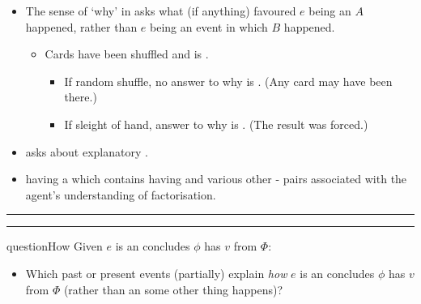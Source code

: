 \documentclass[10pt]{article}
\newcommand\sepLine{
  \vfill
  \par\noindent\rule{\textwidth}{0.4pt}%
  \vspace{-10pt}%
  \par\noindent\rule{\textwidth}{0.4pt}
  \vfill}
\newcommand{\hand}{\ding{43}}
\begin{document}
\begin{note}
  \begin{itemize}
  \item
    The sense of `why' in \qWhy{} asks what (if anything) favoured \(e\) being an \eiw{} \(A\) happened, rather than \(e\) being an event in which \(B\) happened.
    \begin{itemize}
    \item
      Cards have been shuffled and \mainCard{} is \mainCardPos{}.
      \begin{itemize}
      \item
        If random shuffle, no answer to why \mainCard{} is \mainCardPos{}. \hfill (Any card may have been there.)
      \item
        If sleight of hand, answer to why \mainCard{} is \mainCardPos{}. \hfill (The result was forced.)
      \end{itemize}
    \end{itemize}
  \end{itemize}

  \begin{itemize}
  \item[\hand]
    \qWhy{} asks about explanatory .
  \item
    \propM{\rootsCon{}} having \val{}  \fof{} a \pool{} which contains \propM{\rootsConEq{}} having \val{}  and various other - pairs associated with the agent's understanding of factorisation.
  \end{itemize}
\end{note}

\begin{comment}
  Note, \qWhy{} asks about \emph{partial} explanations.
  So, these explanations need not be sufficient.
  And, \qWhy{} does not require the (partial) explanations are necessary.

  In this respect, you're allowed to lose some interest here.
  And, I think the permissiveness of explanation here is potentially an issue.
  That being said, I think some work could be done to add some interesting constraints here.
  The issue is incorporating these constraints into arguments.
  On the one hand, there's an issue of whether the relevant arguments can be made.
  And, on the other hand, there's an issue of complexity.
\end{comment}

\sepLine

\begin{note}
  \begin{question}{questionHow}{\qHow{}}
    Given \(e\) is an  \vAgent{} concludes \prop{} \(\phi\) has \val{} \(v\) from \pool{} \(\Phi\):
    \begin{itemize}
    \item
      Which past or present events (partially) explain \emph{how} \(e\) is an  \vAgent{} concludes \prop{} \(\phi\) has \val{} \(v\) from \pool{} \(\Phi\) (rather than an  some other thing happens)?
    \end{itemize}
    \vspace{-1.5\baselineskip}
  \end{question}
\end{note}
\end{document}
